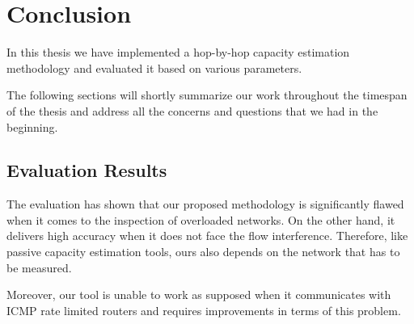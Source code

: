 \chapter{Conclusion}
In this thesis we have implemented a hop-by-hop capacity estimation methodology and evaluated it based on various parameters. 

The following sections will shortly summarize our work throughout the timespan of the thesis and address all the concerns and questions that we had in the beginning.

\section{Evaluation Results}
The evaluation has shown that our proposed methodology is significantly flawed when it comes to the inspection of overloaded networks. On the other hand, it delivers high accuracy when it does not face the flow interference. Therefore, like passive capacity estimation tools, ours also depends on the network that has to be measured. 

Moreover, our tool is unable to work as supposed when it communicates with ICMP rate limited routers and requires improvements in terms of this problem. 

